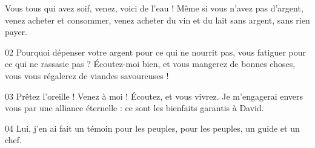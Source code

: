 Vous tous qui avez soif, venez, voici de l’eau ! Même si vous n’avez pas d’argent, venez acheter et consommer, venez acheter du vin et du lait sans argent, sans rien payer.

02 Pourquoi dépenser votre argent pour ce qui ne nourrit pas, vous fatiguer pour ce qui ne rassasie pas ? Écoutez-moi bien, et vous mangerez de bonnes choses, vous vous régalerez de viandes savoureuses !

03 Prêtez l’oreille ! Venez à moi ! Écoutez, et vous vivrez. Je m’engagerai envers vous par une alliance éternelle : ce sont les bienfaits garantis à David.

04 Lui, j’en ai fait un témoin pour les peuples, pour les peuples, un guide et un chef.